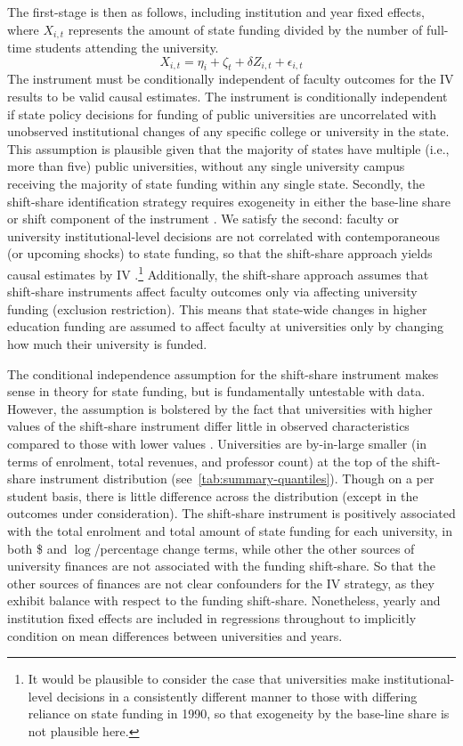 The first-stage is then as follows, including institution and year fixed effects, where $X_{i,t}$ represents the amount of state funding divided by the number of full-time students attending the university.
\begin{equation}
    \label{eqn:firststage}
    X_{i,t} = \eta_i + \zeta_t + \delta Z_{i,t} + \epsilon_{i,t}
\end{equation}
The instrument must be conditionally independent of faculty outcomes for the IV results to be valid causal estimates.
The instrument is conditionally independent if state policy decisions for funding of public universities are uncorrelated with unobserved institutional changes of any specific college or university in the state.
This assumption is plausible given that the majority of states have multiple (i.e., more than five) public universities, without any single university campus receiving the majority of state funding within any single state.
Secondly, the shift-share identification strategy requires exogeneity in either the base-line share or shift component of the instrument \citep{borusyak2022quasi}.
We satisfy the second: faculty or university institutional-level decisions are not correlated with contemporaneous (or upcoming shocks) to state funding, so that the shift-share approach yields causal estimates by IV \citep{NBERw27885}.\footnote{
    It would be plausible to consider the case that universities make institutional-level decisions in a consistently different manner to those with differing reliance on state funding in 1990, so that exogeneity by the base-line share is not plausible here.
}
Additionally, the shift-share approach assumes that shift-share instruments affect faculty outcomes only via affecting university funding (exclusion restriction).
This means that state-wide changes in higher education funding are assumed to affect faculty at universities only by changing how much their university is funded.

The conditional independence assumption for the shift-share instrument makes sense in theory for state funding, but is fundamentally untestable with data.
However, the assumption is bolstered by the fact that universities with higher values of the shift-share instrument differ little in observed characteristics compared to those with lower values \citep{pei2019poorly}.
Universities are by-in-large smaller (in terms of enrolment, total revenues, and professor count) at the top of the shift-share instrument distribution (see~\autoref{tab:summary-quantiles}).
Though on a per student basis, there is little difference across the distribution (except in the outcomes under consideration).
The shift-share instrument is positively associated with the total enrolment and total amount of state funding for each university, in both \$ and $\log$/percentage change terms, while other the other sources of university finances are not associated with the funding shift-share.
So that the other sources of finances are not clear confounders for the IV strategy, as they exhibit balance with respect to the funding shift-share.
Nonetheless, yearly and institution fixed effects are included in regressions throughout to implicitly condition on mean differences between universities and years.

